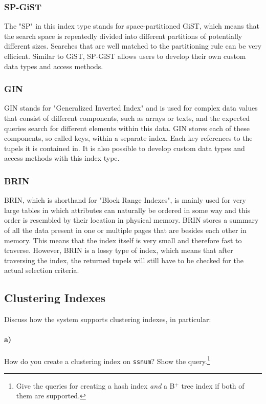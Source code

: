 \documentclass[11pt]{scrartcl}
\begin{document}
\subsubsection{SP-GiST}
The "SP" in this index type stands for space-partitioned GiST, which means that the search space is repeatedly divided into different partitions of potentially different sizes. Searches that are well matched to the partitioning rule can be very efficient. Similar to GiST, SP-GiST allows users to develop their own custom data types and access methods.

\subsubsection{GIN}
GIN stands for "Generalized Inverted Index" and is used for complex data values that consist of different components, such as arrays or texts, and the expected queries search for different elements within this data. GIN stores each of these components, so called keys, within a separate index. Each key references to the tupels it is contained in. It is also possible to develop custom data types and access methods with this index type.

\subsubsection{BRIN}
BRIN, which is shorthand for "Block Range Indexes", is mainly used for very large tables in which attributes can naturally be ordered in some way and this order is resembled by their location in physical memory. BRIN stores a summary of all the data present in one or multiple pages that are besides each other in memory. This means that the index itself is very small and therefore fast to traverse. However, BRIN is a lossy type of index, which means that after traversing the index, the returned tupels will still have to be checked for the actual selection criteria.

\subsection{Clustering Indexes}

Discuss how the system supports clustering indexes, in particular:

\paragraph{a)}

How do you create a clustering index on \texttt{ssnum}? Show the query.\footnote{Give the queries for creating a hash index \emph{and} a B$^+$ tree index if both of them are supported.}
\end{document}

